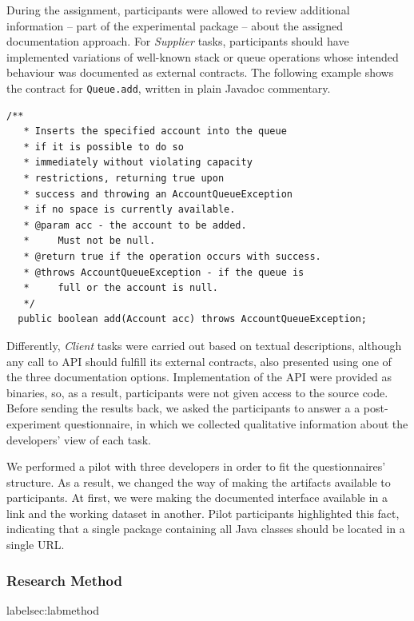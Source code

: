 During the assignment, participants were allowed to review additional information -- part of the experimental package -- about the assigned documentation approach. 
For \textit{Supplier} tasks, participants should have implemented variations of well-known stack or queue operations whose intended behaviour was documented as external contracts. The following example shows the contract for \lstinline!Queue.add!, written in plain Javadoc commentary.
\begin{lstlisting}[basicstyle=\footnotesize\ttfamily,name=figxpi, frame=lines, mathescape=true]
/**
   * Inserts the specified account into the queue 
   * if it is possible to do so 
   * immediately without violating capacity 
   * restrictions, returning true upon 
   * success and throwing an AccountQueueException 
   * if no space is currently available.
   * @param acc - the account to be added. 
   *     Must not be null.
   * @return true if the operation occurs with success.
   * @throws AccountQueueException - if the queue is 
   *     full or the account is null.
   */
  public boolean add(Account acc) throws AccountQueueException;
\end{lstlisting}

Differently, \textit{Client} tasks were carried out based on textual descriptions, although any call to API should fulfill its external contracts, also presented using one of the three documentation options. Implementation of the API were provided as binaries, so, as a result, participants were not given access to the source code.
Before sending the results back, we asked the participants to answer a a post-experiment questionnaire, in which we collected qualitative information about the developers' view of each task.

We performed a pilot with three developers in order to fit the questionnaires' structure.
As a result, we changed the way of making the artifacts available to participants. 
At first, we were making the documented interface available in a link and the working dataset in another. 
Pilot participants highlighted this fact, indicating that a single package containing all Java classes should be located in a single URL.

\subsubsection{Research Method}
label{sec:labmethod}

